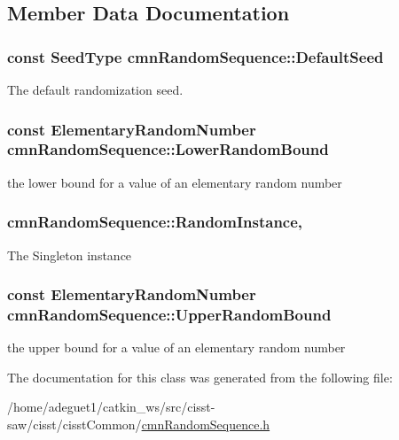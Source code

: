 \subsection{Member Data Documentation}
\hypertarget{classcmn_random_sequence_aa189e86aad2a764fa2faa67732c1b168}{
\subsubsection[{Default\-Seed}]{\setlength{\rightskip}{0pt plus 5cm}const {\bf Seed\-Type} cmn\-Random\-Sequence\-::\-Default\-Seed\hspace{0.3cm}{\ttfamily [static]}}}\label{classcmn_random_sequence_aa189e86aad2a764fa2faa67732c1b168}
The default randomization seed. \hypertarget{classcmn_random_sequence_a3b9788523fe79f42e53a0331355cd73e}{
\subsubsection[{Lower\-Random\-Bound}]{\setlength{\rightskip}{0pt plus 5cm}const {\bf Elementary\-Random\-Number} cmn\-Random\-Sequence\-::\-Lower\-Random\-Bound\hspace{0.3cm}{\ttfamily [static]}}}\label{classcmn_random_sequence_a3b9788523fe79f42e53a0331355cd73e}
the lower bound for a value of an elementary random number \hypertarget{classcmn_random_sequence_a04d180901d880761b49e6c61b79423f3}{
\subsubsection[{Random\-Instance}]{ cmn\-Random\-Sequence\-::\-Random\-Instance\hspace{0.3cm}{\ttfamily [static]}, {\ttfamily [protected]}}}\label{classcmn_random_sequence_a04d180901d880761b49e6c61b79423f3}
The Singleton instance \hypertarget{classcmn_random_sequence_a42566669e8703c6846ce41e286f62e67}{
\subsubsection[{Upper\-Random\-Bound}]{\setlength{\rightskip}{0pt plus 5cm}const {\bf Elementary\-Random\-Number} cmn\-Random\-Sequence\-::\-Upper\-Random\-Bound\hspace{0.3cm}{\ttfamily [static]}}}\label{classcmn_random_sequence_a42566669e8703c6846ce41e286f62e67}
the upper bound for a value of an elementary random number 

The documentation for this class was generated from the following file\-:\begin{DoxyCompactItemize}
\item 
/home/adeguet1/catkin\-\_\-ws/src/cisst-\/saw/cisst/cisst\-Common/\hyperlink{cmn_random_sequence_8h}{cmn\-Random\-Sequence.\-h}\end{DoxyCompactItemize}
